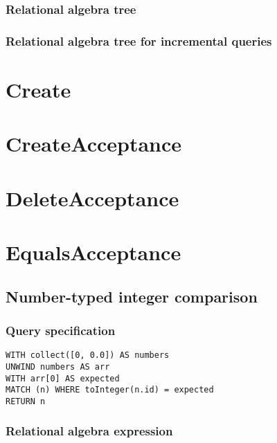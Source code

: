 \subsubsection*{Relational algebra tree}


\subsubsection*{Relational algebra tree for incremental queries}

\section{Create}

\section{CreateAcceptance}

\section{DeleteAcceptance}

\section{EqualsAcceptance}


\subsection{Number-typed integer comparison}

\subsubsection*{Query specification}

\begin{lstlisting}
WITH collect([0, 0.0]) AS numbers
UNWIND numbers AS arr
WITH arr[0] AS expected
MATCH (n) WHERE toInteger(n.id) = expected
RETURN n
\end{lstlisting}

\subsubsection*{Relational algebra expression}

